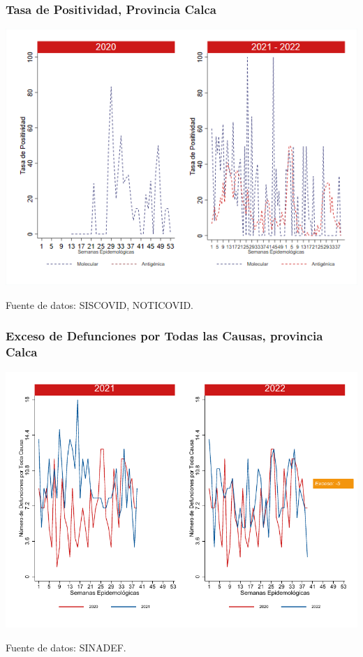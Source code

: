 \documentclass[xcolor=table]{beamer}
\begin{document}
\begin{frame}
	\frametitle{Tasa de Positividad, Provincia Calca}
	\vspace{-.5cm}
	\begin{center}
		\includegraphics[width=0.8\linewidth, trim={0cm .5cm 0cm 0.2cm},clip]{../figuras/positividad_20_21_3.png}
	\end{center}
	{\tiny Fuente de datos: SISCOVID, NOTICOVID.}
\end{frame}

\begin{frame}
	\frametitle{Exceso de Defunciones por Todas las Causas, provincia Calca}
	\vspace{-.5cm}
	\begin{center}
		\includegraphics[width=0.8\linewidth, trim={0cm .5cm 0cm 0.2cm},clip]{../figuras/exceso_3.pdf}
	\end{center}
	{\tiny Fuente de datos: SINADEF.}
	
	\hyperlink{indicadores_provinciales}{}
\end{frame}
\end{document}
